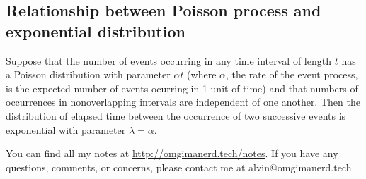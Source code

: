 \documentclass[letterpaper, 12pt]{math}
\begin{document}
\subsection*{Relationship between Poisson process and exponential distribution}
Suppose that the number of events occurring in any time interval of length
\( t \) has a Poisson distribution with parameter \( \alpha t \) (where
\( \alpha \), the rate of the event process, is the expected number of events
ocurring in 1 unit of time) and that numbers of occurrences in nonoverlapping
intervals are independent of one another. Then the distribution of elapsed time
between the occurrence of two successive events is exponential with parameter
\( \lambda = \alpha \).

\begin{center}
  You can find all my notes at \url{http://omgimanerd.tech/notes}. If you have
  any questions, comments, or concerns, please contact me at
  alvin@omgimanerd.tech
\end{center}
\end{document}
